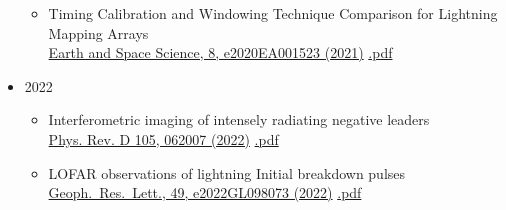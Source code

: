 \documentclass[fleqn,11pt]{article}
\begin{document}
\begin{itemize}
\begin{itemize}
\item Timing Calibration and Windowing Technique Comparison for Lightning Mapping Arrays
\\ \href{https://doi.org/10.1029/2020EA001523}{Earth and Space Science, 8, e2020EA001523 (2021)}
\href{https://drive.google.com/file/d/15urHwVZXfel0uyUzWu4ewdt0grnUBFU0/view?usp=sharing}{.pdf}

\end{itemize}

\item{2022}
\begin{itemize}

\item Interferometric imaging of intensely radiating negative leaders \\ \href{https://doi.org/10.1103/PhysRevD.105.062007}{Phys. Rev. D 105, 062007  (2022)}
    \href{https://drive.google.com/file/d/1PbEqehbKbr3qaUwMkZkkWnwzt8WfMe9h/view?usp=sharing}{.pdf}

\item LOFAR observations of lightning Initial breakdown pulses \\ \href{https://doi.org/10.1029/2022GL098073}{Geoph.\ Res.\ Lett., 49, e2022GL098073 (2022)}
    \href{https://drive.google.com/file/d/1d6TCCdg21TRj5sqfX25mzrnUxmd06VG6/view?usp=sharing}{.pdf}

\end{itemize}
\end{itemize}
\end{document}
